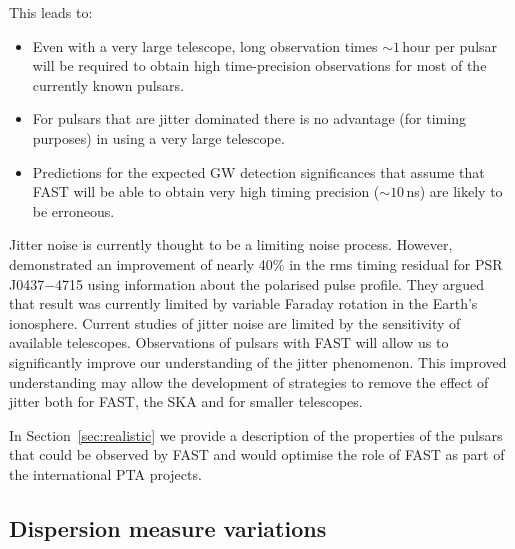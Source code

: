 \documentclass{raa}            %
\begin{document}
  This leads to:
\begin{itemize}
\item Even with a very large telescope, long observation times $\sim 1$\,hour per pulsar will be required to obtain high time-precision observations for most of the currently known pulsars.  
\item For pulsars that are jitter dominated there is no advantage (for timing purposes) in using a very large telescope.
\item Predictions for the expected GW detection significances that assume that FAST will be able to obtain very high timing precision ($\sim 10$\,ns) are likely to be erroneous.
\end{itemize}  

Jitter noise is currently thought to be a limiting noise process. However, \cite{ovdb13} demonstrated an improvement of nearly 40\% in the rms timing residual for PSR J0437$-$4715 using information about the polarised pulse profile.  They argued that result was currently limited by variable Faraday rotation in the Earth's ionosphere.  Current studies of jitter noise are limited by the sensitivity of available telescopes.  Observations of pulsars with FAST will allow us to significantly improve our understanding of the jitter phenomenon. This improved understanding may allow the development of strategies to remove the effect of jitter both for FAST, the SKA and for smaller telescopes.

In Section~\ref{sec:realistic} we provide a description of the properties of the pulsars that could be observed by FAST and would optimise the role of FAST as part of the international PTA projects.

\subsection{Dispersion measure variations}
\end{document}
